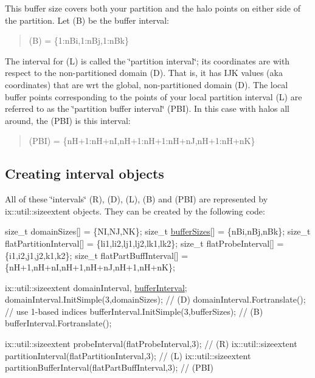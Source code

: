 This buffer size covers both your partition and the halo points on either side of the partition. Let (B) be the buffer interval\+:

\begin{quote}
(B) = \{1\+:n\+Bi,1\+:n\+Bj,1\+:n\+Bk\} \end{quote}




The interval for (L) is called the \char`\"{}partition interval\char`\"{}; it\textquotesingle{}s coordinates are with respect to the non-\/partitioned domain (D). That is, it has I\+JK values (aka coordinates) that are wrt the global, non-\/partitioned domain (D). The local buffer points corresponding to the points of your local partition interval (L) are referred to as the \char`\"{}partition buffer interval\char`\"{} (P\+BI). In this case with halos all around, the (P\+BI) is this interval\+:

\begin{quote}
(P\+BI) = \{n\+H+1\+:n\+H+nI,n\+H+1\+:n\+H+1\+:n\+H+nJ,n\+H+1\+:n\+H+nK\} \end{quote}
\hypertarget{developer_reference_creation}{}\subsection{Creating interval objects}\label{developer_reference_creation}
All of these \char`\"{}intervals\char`\"{} (R), (D), (L), (B) and (P\+BI) are represented by ix\+::util\+::sizeextent objects. They can be created by the following code\+:


\begin{DoxyCode}
\textcolor{keywordtype}{size\_t} domainSizes[]           = \{NI,NJ,NK\}; 
\textcolor{keywordtype}{size\_t} \hyperlink{MetricKernels_8H_af0ac147fcc3cf0ebf0ce192160b920b2}{bufferSizes}[]           = \{nBi,nBj,nBk\};
\textcolor{keywordtype}{size\_t} flatPartitionInterval[] = \{li1,li2,lj1,lj2,lk1,lk2\};
\textcolor{keywordtype}{size\_t} flatProbeInterval[]     = \{i1,i2,j1,j2,k1,k2\};      
\textcolor{keywordtype}{size\_t} flatPartBuffInterval[]  = \{nH+1,nH+nI,nH+1,nH+nJ,nH+1,nH+nK\};
                                                                    
ix::util::sizeextent domainInterval, \hyperlink{SATKernels_8H_a4caa6f5ca62531b8c31e22919f206d68}{bufferInterval};                
domainInterval.InitSimple(3,domainSizes);           \textcolor{comment}{// (D)                    }
domainInterval.Fortranslate();                      \textcolor{comment}{// use 1-based indices              }
bufferInterval.InitSimple(3,bufferSizes);           \textcolor{comment}{// (B)                    }
bufferInterval.Fortranslate();                                      
                                                                    
ix::util::sizeextent probeInterval(flatProbeInterval,3);              \textcolor{comment}{// (R) }
ix::util::sizeextent partitionInterval(flatPartitionInterval,3);      \textcolor{comment}{// (L) }
ix::util::sizeextent partitionBufferInterval(flatPartBuffInterval,3); \textcolor{comment}{// (PBI)}
\end{DoxyCode}


